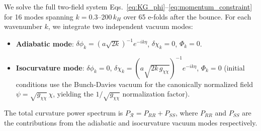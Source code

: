 \documentclass[11pt,a4paper]{article}
\begin{document}
We solve the full two-field system Eqs.~\eqref{eq:KG_phi}--\eqref{eq:momentum_constraint} for 16 modes spanning $k = 0.3$--$200\,k_H$ over 65 e-folds after the bounce. For each wavenumber $k$, we integrate two independent vacuum modes:
\begin{itemize}
\item \textbf{Adiabatic mode}: $\delta\phi_k = (a\sqrt{2k})^{-1}e^{-ik\eta}$, $\delta\chi_k = 0$, $\Phi_k = 0$.
\item \textbf{Isocurvature mode}: $\delta\phi_k = 0$, $\delta\chi_k = (a\sqrt{2k\,g_{\chi\chi}})^{-1}e^{-ik\eta}$, $\Phi_k = 0$ (initial conditions use the Bunch-Davies vacuum for the canonically normalized field $\psi = \sqrt{g_{\chi\chi}}\,\chi$, yielding the $1/\sqrt{g_{\chi\chi}}$ normalization factor).
\end{itemize}
The total curvature power spectrum is $P_\mathcal{R} = P_{RR} + P_{SS}$, where $P_{RR}$ and $P_{SS}$ are the contributions from the adiabatic and isocurvature vacuum modes respectively.
\end{document}
